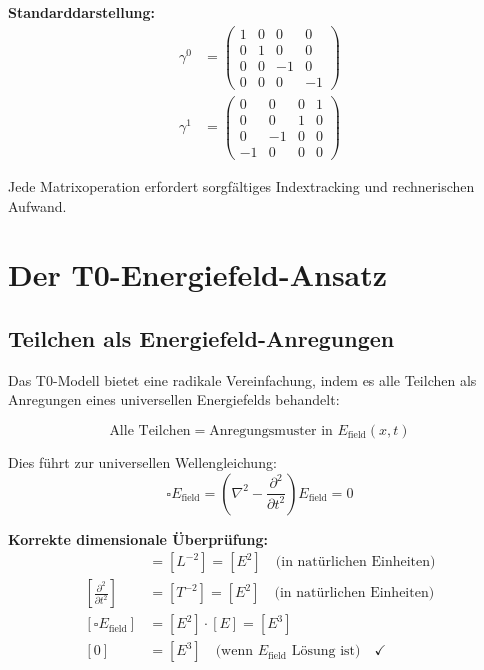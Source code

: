 \documentclass[12pt,a4paper]{report}
\begin{document}
	\textbf{Standarddarstellung:}
	\begin{align}
		\gamma^0 &= \begin{pmatrix} 1 & 0 & 0 & 0 \\ 0 & 1 & 0 & 0 \\ 0 & 0 & -1 & 0 \\ 0 & 0 & 0 & -1 \end{pmatrix} \\
		\gamma^1 &= \begin{pmatrix} 0 & 0 & 0 & 1 \\ 0 & 0 & 1 & 0 \\ 0 & -1 & 0 & 0 \\ -1 & 0 & 0 & 0 \end{pmatrix}
	\end{align}
	
	Jede Matrixoperation erfordert sorgfältiges Indextracking und rechnerischen Aufwand.
	
	\section{Der T0-Energiefeld-Ansatz}
	\label{sec:t0_energy_approach}
	
	\subsection{Teilchen als Energiefeld-Anregungen}
	\label{subsec:energy_field_excitations}
	
	Das T0-Modell bietet eine radikale Vereinfachung, indem es alle Teilchen als Anregungen eines universellen Energiefelds behandelt:
	
	\begin{equation}
		\boxed{\text{Alle Teilchen} = \text{Anregungsmuster in } E_{\text{field}}(x,t)}
	\end{equation}
	
	Dies führt zur universellen Wellengleichung:
	\begin{equation}
		\boxed{\square E_{\text{field}} = \left(\nabla^2 - \frac{\partial^2}{\partial t^2}\right) E_{\text{field}} = 0}
		\label{eq:universal_wave_equation}
	\end{equation}
	
	\textbf{Korrekte dimensionale Überprüfung:}
	\begin{align}
		[\nabla^2] &= [L^{-2}] = [E^2] \quad \text{(in natürlichen Einheiten)} \\
		\left[\frac{\partial^2}{\partial t^2}\right] &= [T^{-2}] = [E^2] \quad \text{(in natürlichen Einheiten)} \\
		[\square E_{\text{field}}] &= [E^2] \cdot [E] = [E^3] \\
		[0] &= [E^3] \quad \text{(wenn } E_{\text{field}} \text{ Lösung ist)} \quad \checkmark
	\end{align}
	
\end{document}

